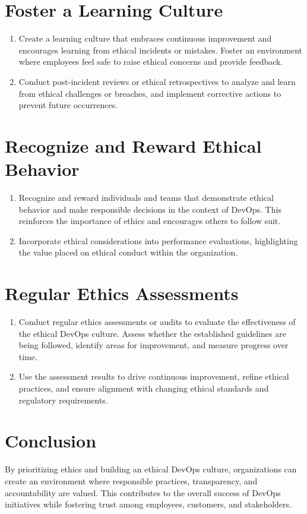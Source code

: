 \section*{Foster a Learning Culture}
        \begin{enumerate}
            \item Create a learning culture that embraces continuous improvement and encourages learning from ethical incidents or mistakes. Foster an environment where employees feel safe to raise ethical concerns and provide feedback.
    
            \item Conduct post-incident reviews or ethical retrospectives to analyze and learn from ethical challenges or breaches, and implement corrective actions to prevent future occurrences.
        \end{enumerate}

\section*{Recognize and Reward Ethical Behavior}
        \begin{enumerate}
            \item Recognize and reward individuals and teams that demonstrate ethical behavior and make responsible decisions in the context of DevOps. This reinforces the importance of ethics and encourages others to follow suit.
    
            \item Incorporate ethical considerations into performance evaluations, highlighting the value placed on ethical conduct within the organization.
        \end{enumerate}

\section*{Regular Ethics Assessments}
        \begin{enumerate}
            \item Conduct regular ethics assessments or audits to evaluate the effectiveness of the ethical DevOps culture. Assess whether the established guidelines are being followed, identify areas for improvement, and measure progress over time.
    
            \item Use the assessment results to drive continuous improvement, refine ethical practices, and ensure alignment with changing ethical standards and regulatory requirements.
        \end{enumerate}


\section*{Conclusion}

By prioritizing ethics and building an ethical DevOps culture, organizations can create an environment where responsible practices, transparency, and accountability are valued. This contributes to the overall success of DevOps initiatives while fostering trust among employees, customers, and stakeholders.